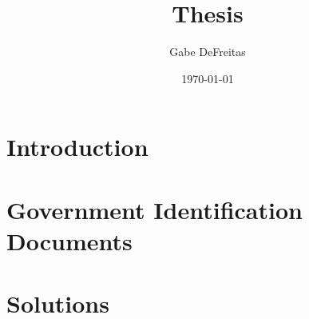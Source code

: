 \documentclass{report}
\title{Thesis}
\author{Gabe DeFreitas}
\date{\today}
\begin{document}
\maketitle
\tableofcontents

\chapter{Introduction}




\chapter{Government Identification Documents}





\chapter{Solutions}

\printbibliography
\end{document}
